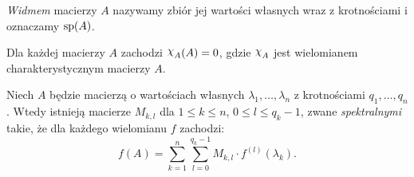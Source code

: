 %
\begin{definition}
  \emph{Widmem} macierzy $A$ nazywamy zbiór jej wartości własnych wraz z krotnościami i oznaczamy $\operatorname{sp} (A)$.
\end{definition}
%
\begin{theorem} \label{T: H-C}
  Dla każdej macierzy $A$ zachodzi $\mychi_A(A) = 0$, gdzie $\mychi_A$ jest wielomianem charakterystycznym macierzy $A$.
\end{theorem}
%
\begin{theorem}
  Niech $A$ będzie macierzą o wartościach własnych $\lambda_1,\ldots,\lambda_n$ z krotnościami $q_1,\ldots,q_n$. Wtedy 
  istnieją macierze $M_{k,l}$ dla $1 \leq k \leq n$, $0 \leq l \leq q_k-1$, zwane \emph{spektralnymi} takie, że dla 
  każdego wielomianu $f$ zachodzi:
%
  \begin{equation*}
    f(A) = \sum_{k=1}^{n} \sum_{l=0}^{q_k-1} M_{k,l} \cdot f^{(l)}(\lambda_k).
  \end{equation*}
\end{theorem}
%
